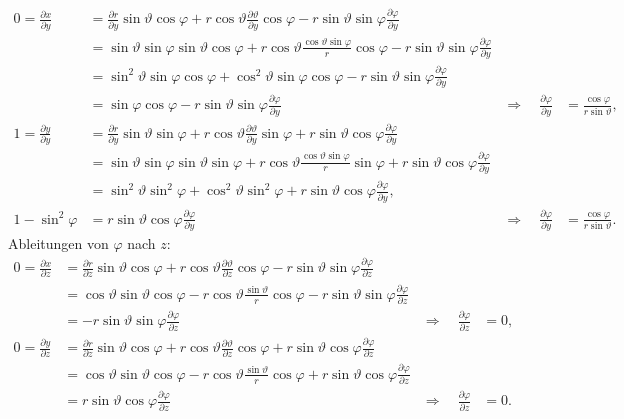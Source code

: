\begin{align*}
0=\frac{\partial x}{\partial y}
&=
\frac{\partial r}{\partial y}
\sin\vartheta\cos\varphi
+
r\cos\vartheta
\frac{\partial\vartheta}{\partial y}
\cos\varphi
-
r\sin\vartheta\sin\varphi
\frac{\partial\varphi}{\partial y}
\\
&=
\sin\vartheta\sin\varphi
\sin\vartheta\cos\varphi
+
r\cos\vartheta
\frac{\cos\vartheta\sin\varphi}{r}
\cos\varphi
-
r\sin\vartheta\sin\varphi
\frac{\partial\varphi}{\partial y}
\\
&=
\sin^2\vartheta \sin\varphi \cos\varphi
+
\cos^2\vartheta \sin\varphi \cos\varphi
-
r\sin\vartheta\sin\varphi
\frac{\partial\varphi}{\partial y}
\\
&=
\sin\varphi \cos\varphi
-
r\sin\vartheta\sin\varphi
\frac{\partial\varphi}{\partial y}
&\Rightarrow\quad
\frac{\partial\varphi}{\partial y}
&=
\frac{\cos\varphi}{r\sin\vartheta},
\\
1=\frac{\partial y}{\partial y}
&=
\frac{\partial r}{\partial y}
\sin\vartheta \sin\varphi
+
r\cos\vartheta
\frac{\partial\vartheta}{\partial y}
\sin\varphi
+
r\sin\vartheta\cos\varphi
\frac{\partial\varphi}{\partial y}
\\
&=
\sin\vartheta \sin\varphi
\sin\vartheta \sin\varphi
+
r\cos\vartheta
\frac{\cos\vartheta\sin\varphi}{r}
\sin\varphi
+
r\sin\vartheta\cos\varphi
\frac{\partial\varphi}{\partial y}
\\
&=
\sin^2\vartheta \sin^2\varphi
+
\cos^2\vartheta
\sin^2\varphi
+
r\sin\vartheta\cos\varphi
\frac{\partial\varphi}{\partial y},
\\
1-
\sin^2\varphi
&=
r\sin\vartheta\cos\varphi
\frac{\partial\varphi}{\partial y}
&
\Rightarrow\quad
\frac{\partial\varphi}{\partial y}
&=
\frac{\cos\varphi}{r\sin\vartheta}.
\end{align*}
Ableitungen von $\varphi$ nach $z$:
\begin{align*}
0=\frac{\partial x}{\partial z}
&=
\frac{\partial r}{\partial z}
\sin\vartheta\cos\varphi
+
r\cos\vartheta
\frac{\partial\vartheta}{\partial z}
\cos\varphi
-
r\sin\vartheta\sin\varphi
\frac{\partial\varphi}{\partial z}
\\
&=
\cos\vartheta
\sin\vartheta\cos\varphi
-
r\cos\vartheta
\frac{\sin\vartheta}{r}
\cos\varphi
-
r\sin\vartheta\sin\varphi
\frac{\partial\varphi}{\partial z}
\\
&=
-
r\sin\vartheta\sin\varphi
\frac{\partial\varphi}{\partial z}
&\Rightarrow\quad
\frac{\partial\varphi}{\partial z}
&=0,
\\
0=\frac{\partial y}{\partial z}
&=
\frac{\partial r}{\partial z}
\sin\vartheta\cos\varphi
+
r\cos\vartheta
\frac{\partial\vartheta}{\partial z}
\cos\varphi
+
r\sin\vartheta\cos\varphi
\frac{\partial\varphi}{\partial z}
\\
&=
\cos\vartheta
\sin\vartheta\cos\varphi
-
r\cos\vartheta
\frac{\sin\vartheta}{r}
\cos\varphi
+
r\sin\vartheta\cos\varphi
\frac{\partial\varphi}{\partial z}
\\
&=
r\sin\vartheta\cos\varphi
\frac{\partial\varphi}{\partial z}
&\Rightarrow\quad
\frac{\partial\varphi}{\partial z}
&=0.
\end{align*}
